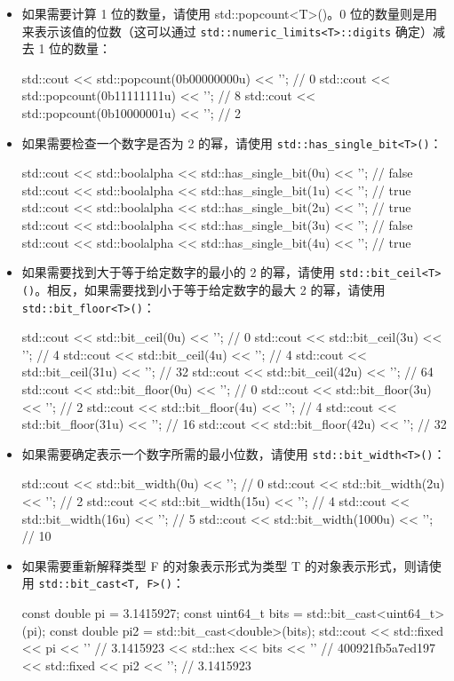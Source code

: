 \begin{itemize}
\item
如果需要计算 1 位的数量，请使用 std::popcount<T>()。0 位的数量则是用来表示该值的位数（这可以通过 \verb|std::numeric_limits<T>::digits| 确定）减去 1 位的数量：

\begin{cpp}
std::cout << std::popcount(0b00000000u) << '\n'; // 0
std::cout << std::popcount(0b11111111u) << '\n'; // 8
std::cout << std::popcount(0b10000001u) << '\n'; // 2
\end{cpp}

\item
如果需要检查一个数字是否为 2 的幂，请使用 \verb|std::has_single_bit<T>()|：

\begin{cpp}
std::cout << std::boolalpha << std::has_single_bit(0u) << '\n'; // false
std::cout << std::boolalpha << std::has_single_bit(1u) << '\n'; // true
std::cout << std::boolalpha << std::has_single_bit(2u) << '\n'; // true
std::cout << std::boolalpha << std::has_single_bit(3u) << '\n'; // false
std::cout << std::boolalpha << std::has_single_bit(4u) << '\n'; // true
\end{cpp}

\item
如果需要找到大于等于给定数字的最小的 2 的幂，请使用 \verb|std::bit_ceil<T>()|。相反，如果需要找到小于等于给定数字的最大 2 的幂，请使用 \verb|std::bit_floor<T>()|：

\begin{cpp}
std::cout << std::bit_ceil(0u)  << '\n'; // 0
std::cout << std::bit_ceil(3u)  << '\n'; // 4
std::cout << std::bit_ceil(4u)  << '\n'; // 4
std::cout << std::bit_ceil(31u) << '\n'; // 32
std::cout << std::bit_ceil(42u) << '\n'; // 64
std::cout << std::bit_floor(0u)  << '\n'; // 0
std::cout << std::bit_floor(3u)  << '\n'; // 2
std::cout << std::bit_floor(4u)  << '\n'; // 4
std::cout << std::bit_floor(31u) << '\n'; // 16
std::cout << std::bit_floor(42u) << '\n'; // 32
\end{cpp}

\item
如果需要确定表示一个数字所需的最小位数，请使用 \verb|std::bit_width<T>()|：

\begin{cpp}
std::cout << std::bit_width(0u)    << '\n'; // 0
std::cout << std::bit_width(2u)    << '\n'; // 2
std::cout << std::bit_width(15u)   << '\n'; // 4
std::cout << std::bit_width(16u)   << '\n'; // 5
std::cout << std::bit_width(1000u) << '\n'; // 10
\end{cpp}

\item
如果需要重新解释类型 F 的对象表示形式为类型 T 的对象表示形式，则请使用 \verb|std::bit_cast<T, F>()|：

\begin{cpp}
const double   pi   = 3.1415927;
const uint64_t bits = std::bit_cast<uint64_t>(pi);
const double   pi2  = std::bit_cast<double>(bits);
std::cout
    << std::fixed << pi   << '\n' // 3.1415923
    << std::hex   << bits << '\n' // 400921fb5a7ed197
    << std::fixed << pi2  << '\n';  // 3.1415923
\end{cpp}
\end{itemize}

